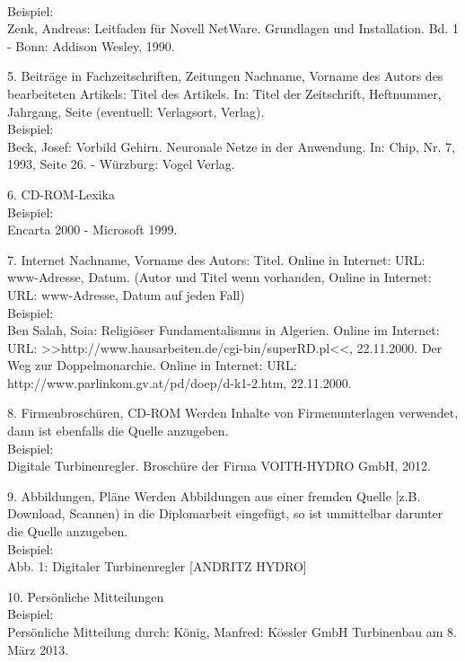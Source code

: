 \documentclass[12pt,a4paper]{article}
\begin{document}
{{{\begin{description*}
		\\[1mm]Beispiel:
		\\Zenk, Andreas: Leitfaden für Novell NetWare. Grundlagen und Installation. Bd. 1 - Bonn:
		Addison Wesley, 1990.
		\vspace*{2mm}
	\item[5. Beiträge in Fachzeitschriften, Zeitungen] Nachname, Vorname des Autors des bearbeiteten
		Artikels: Titel des Artikels. In: Titel der Zeitschrift, Heftnummer, Jahrgang, Seite
		(eventuell: Verlagsort, Verlag).
		\\[1mm]Beispiel:
		\\Beck, Josef: Vorbild Gehirn. Neuronale Netze in der Anwendung. In: Chip, Nr. 7, 1993,
		Seite 26. - Würzburg: Vogel Verlag.
		\vspace*{2mm}
	\item[6. CD-ROM-Lexika]\hfill
		\\[1mm]Beispiel:
		\\Encarta 2000 - Microsoft 1999.
		\vspace*{2mm}
	\item[7. Internet] Nachname, Vorname des Autors: Titel. Online in Internet: URL: www-Adresse, Datum.
		(Autor und Titel wenn vorhanden, Online in Internet: URL: www-Adresse, Datum auf
		jeden Fall)
		\\[1mm]Beispiel:
		\\Ben Salah, Soia: Religiöser Fundamentalismus in Algerien. Online im Internet:
		URL: >>http:/\slash{}www.hausarbeiten.de\slash{}cgi-bin\slash{}superRD.pl<<,
		22.11.2000. Der Weg zur Doppelmonarchie.
		Online in Internet: URL:
		http:/\slash{}www.parlinkom.gv.at\slash{}pd\slash{}doep\slash{}d-k1-2.htm,
		22.11.2000.
		\vspace*{2mm}
	\item[8. Firmenbroschüren, CD-ROM] Werden Inhalte von Firmenunterlagen verwendet,
		dann ist ebenfalls die Quelle anzugeben.
		\\[1mm]Beispiel:
		\\Digitale Turbinenregler. Broschüre der Firma VOITH-HYDRO GmbH, 2012.
		\vspace*{2mm}
	\item[9. Abbildungen, Pläne] Werden Abbildungen aus einer fremden Quelle
		[z.B. Download, Scannen) in die Diplomarbeit eingefügt,
		so ist unmittelbar darunter die Quelle anzugeben.
		\\[1mm]Beispiel:
		\\Abb. 1: Digitaler Turbinenregler [ANDRITZ HYDRO]
		\vspace*{2mm}
	\item[10. Persönliche Mitteilungen]\hfill
		\\[1mm]Beispiel:
		\\Persönliche Mitteilung durch: König, Manfred:
		Kössler GmbH Turbinenbau am 8. März 2013.
	\end{description*}
	}}%













}
\end{document}
